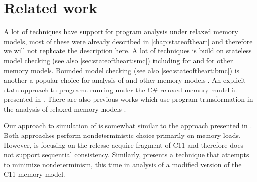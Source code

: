 \section{Related work}

A lot of techniques have support for program analysis under relaxed memory models, most of these were already described in \autoref{chap:stateoftheart} and therefore we will not replicate the description here.
A lot of techniques is build on stateless model checking (see also \autoref{sec:stateoftheart:smc}) including  for \xtso and  for other memory models. Bounded model checking (see also \autoref{sec:stateoftheart:bmc}) is another a popular choice for analysis of \xtso {} and other memory models .
An explicit state approach to programs running under the C\# relaxed memory model is presented in .
There are also previous works which use program transformation in the analysis of relaxed memory models .

Our approach to simulation of \xtso is somewhat similar to the approach presented in . Both approaches perform nondeterministic choice primarily on memory loads. However, \cite{Abdulla2018} is focusing on the release-acquire fragment of C11 and therefore does not support sequential consistency.
Similarly,  presents a technique that attempts to minimize nondeterminism, this time in analysis of a modified version of the C11 memory model.

